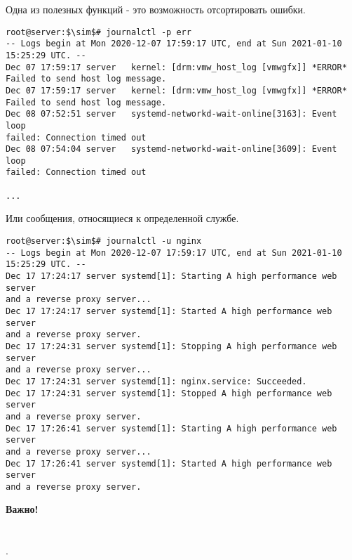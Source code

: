 \documentclass[14pt, a4paper]{article}
\begin{document}
Одна из полезных функций - это возможность отсортировать ошибки.

\vspace{0.3cm}
\begin{lstlisting}
root@server:$\sim$# journalctl -p err
-- Logs begin at Mon 2020-12-07 17:59:17 UTC, end at Sun 2021-01-10 
15:25:29 UTC. --
Dec 07 17:59:17 server   kernel: [drm:vmw_host_log [vmwgfx]] *ERROR* 
Failed to send host log message.   
Dec 07 17:59:17 server   kernel: [drm:vmw_host_log [vmwgfx]] *ERROR*
Failed to send host log message.  
Dec 08 07:52:51 server   systemd-networkd-wait-online[3163]: Event loop 
failed: Connection timed out
Dec 08 07:54:04 server   systemd-networkd-wait-online[3609]: Event loop
failed: Connection timed out

...
\end{lstlisting}
\vspace{0.2cm}

Или сообщения, относящиеся к определенной службе.

\vspace{0.3cm}
\begin{lstlisting}
root@server:$\sim$# journalctl -u nginx
-- Logs begin at Mon 2020-12-07 17:59:17 UTC, end at Sun 2021-01-10 
15:25:29 UTC. --
Dec 17 17:24:17 server systemd[1]: Starting A high performance web server 
and a reverse proxy server...
Dec 17 17:24:17 server systemd[1]: Started A high performance web server 
and a reverse proxy server.
Dec 17 17:24:31 server systemd[1]: Stopping A high performance web server 
and a reverse proxy server...
Dec 17 17:24:31 server systemd[1]: nginx.service: Succeeded.
Dec 17 17:24:31 server systemd[1]: Stopped A high performance web server 
and a reverse proxy server.
Dec 17 17:26:41 server systemd[1]: Starting A high performance web server 
and a reverse proxy server...
Dec 17 17:26:41 server systemd[1]: Started A high performance web server 
and a reverse proxy server.
\end{lstlisting}
\vspace{0.2cm}

\textbf{Важно!}  \\
 \\
 \\ 
.
\end{document}
